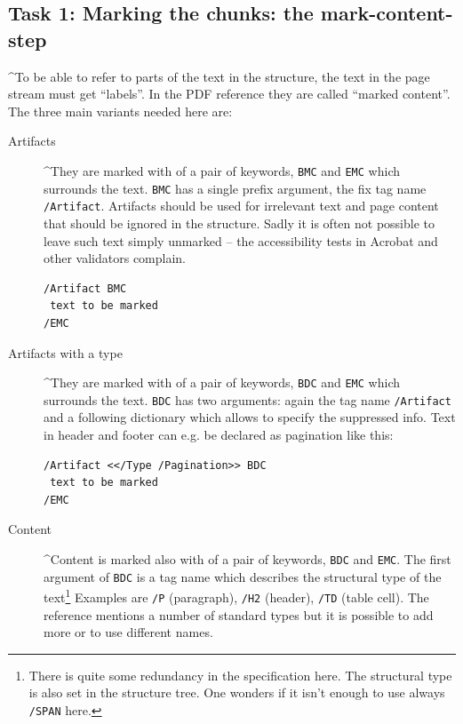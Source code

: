 \documentclass[DIV=12,parskip=half-,bibliography=totoc]{scrartcl}
\newcommand\PDF{PDF}
\begin{document}
\subsection{Task 1: Marking the chunks: the mark-content-step}


\TagP^To be able to refer to parts of the text in the structure, the text in the page stream must get \enquote{labels}. In the \PDF{} reference they are called \enquote{marked content}. The three main variants needed here are:\TagPend

\begin{description}
\item[Artifacts] \TagP^They are marked with of a pair of keywords, \texttt{BMC} and \texttt{EMC} which surrounds the text. \texttt{BMC} has a single prefix argument, the fix tag name \texttt{/Artifact}. Artifacts should be used for irrelevant text and page content that should be ignored in the structure. Sadly it is often not possible to leave such text simply unmarked -- the accessibility tests in Acrobat and other validators complain.\TagPend


\begin{lstlisting}
/Artifact BMC
 text to be marked
/EMC
\end{lstlisting}

\meti



\item[Artifacts with a type] \TagP^They are marked with of a pair of keywords, \texttt{BDC} and \texttt{EMC} which surrounds the text. \texttt{BDC} has two arguments: again the tag name \texttt{/Artifact} and a following dictionary which allows to specify the suppressed info. Text in header and footer can e.g. be declared as pagination like this:\TagPend


\begin{lstlisting}
/Artifact <</Type /Pagination>> BDC
 text to be marked
/EMC
\end{lstlisting}

\meti


\item[Content]  \TagP^Content is marked also with of a pair of keywords, \texttt{BDC} and \texttt{EMC}. The first argument of \texttt{BDC} is a tag name which describes the structural type of the text\footnote{There is quite some redundancy in the specification here. The structural type is also set in the structure tree. One wonders if it isn't enough to use  always \texttt{/SPAN} here.}
    Examples are \texttt{/P} (paragraph), \texttt{/H2} (header), \texttt{/TD} (table cell). The reference mentions a number of standard types but it is possible to add more or to use different names.


\end{description}
\end{document}
